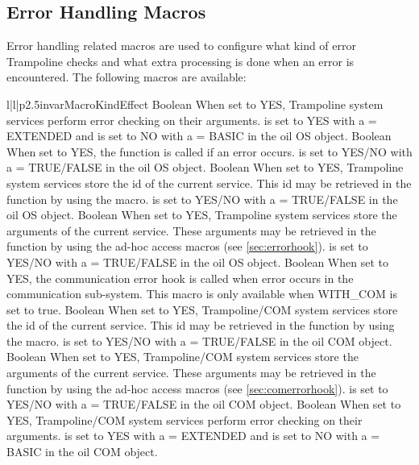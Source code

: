 \subsection{Error Handling Macros}

Error handling related macros are used to configure what kind of error Trampoline checks and what extra processing is done when an error is encountered. The following macros are available:

\begin{longtableiii}{l|l|p{2.5in}}{var}{Macro}{Kind}{Effect}
  {Boolean}
  {When set to YES, Trampoline system services perform error checking on their arguments.  is set to YES with a  = EXTENDED and is set to NO with a  = BASIC in the oil OS object.}
  {Boolean}
  {When set to YES, the  function is called if an error occurs.  is set to YES/NO with a  = TRUE/FALSE in the oil OS object.}
  {Boolean}
  {When set to YES, Trampoline system services store the id of the current service. This id may be retrieved in the  function by using the  macro.  is set to YES/NO with a  = TRUE/FALSE in the oil OS object.}
  {Boolean}
  {When set to YES, Trampoline system services store the arguments of the current service. These arguments may be retrieved in the  function by using the ad-hoc access macros (see \ref{sec:errorhook}).  is set to YES/NO with a  = TRUE/FALSE in the oil OS object.}
  {Boolean}
  {When set to YES, the communication error hook is called when error occurs in the communication sub-system. This macro is only available when WITH_COM is set to true.}
  {Boolean}
  {When set to YES, Trampoline/COM system services store the id of the current service. This id may be retrieved in the  function by using the  macro.  is set to YES/NO with a  = TRUE/FALSE in the oil COM object.}
  {Boolean}
  {When set to YES, Trampoline/COM system services store the arguments of the current service. These arguments may be retrieved in the  function by using the ad-hoc access macros (see \ref{sec:comerrorhook}).  is set to YES/NO with a  = TRUE/FALSE in the oil COM object.}
  {Boolean}
  {When set to YES, Trampoline/COM system services perform error checking on their arguments.  is set to YES with a  = EXTENDED and is set to NO with a  = BASIC in the oil COM object.}
\end{longtableiii}

